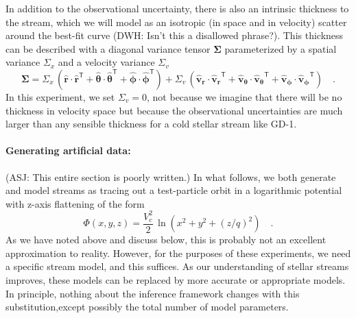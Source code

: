 \documentclass[12pt,preprint]{aastex}
\newcommand{\mtensor}[1]{\boldsymbol{#1}}
\newcommand{\mSigma}{\mtensor{\Sigma}}
\newcommand{\mvector}[1]{\mtensor{#1}}
\renewcommand{\vr}{\mvector{r}}
\newcommand{\vv}{\mvector{v}}
\newcommand{\vtheta}{\mvector{\theta}}
\newcommand{\vphi}{\mvector{\phi}}
\newcommand{\transpose}[1]{{#1}^{\textsf{T}}}
\newcommand{\rhat}{\hat{\vr}}
\newcommand{\thetahat}{\hat{\vtheta}}
\newcommand{\phihat}{\hat{\vphi}}
\newcommand{\vhat}{\hat{\vv}}
\begin{document}
In addition to the observational uncertainty, there is also an
intrinsic thickness to the stream, which we will model as an isotropic
(in space and in velocity) scatter around the best-fit curve (DWH: Isn't this a disallowed phrase?).  This
thickness can be described with a diagonal variance tensor $\mSigma$
parameterized by a spatial variance $\Sigma_x$ and a velocity variance
$\Sigma_v$
\begin{equation}
\mSigma =
  \Sigma_x\,(\rhat\cdot\transpose{\rhat}
            +\thetahat\cdot\transpose{\thetahat}
            +\phihat\cdot\transpose{\phihat})
 +\Sigma_v\,(\vhat_{\vr}\cdot\transpose{\vhat_{\vr}}
            +\vhat_{\vtheta}\cdot\transpose{\vhat_{\vtheta}}
            +\vhat_{\vphi}\cdot\transpose{\vhat_{\vphi}})
\quad .
\end{equation}
In this experiment, we set $\Sigma_v=0$, not because we imagine that
there will be no thickness in velocity space but because the
observational uncertainties are much larger than any sensible
thickness for a cold stellar stream like GD-1.

\paragraph{Generating artificial data:}
(ASJ: This entire section is poorly written.)
In what follows, we both generate and model streams as tracing out a
test-particle orbit in a logarithmic potential with z-axis flattening of the form
\begin{equation}
\Phi(x,y,z) = \frac{V_c^2}{2}\,\ln(x^2+y^2+(z/q)^2)
\quad.
\end{equation}
As we have noted above and discuss below, this is probably not an excellent 
approximation to reality.  However, for the purposes of these experiments, we need a
specific stream model, and this suffices.  As our understanding of
stellar streams improves, these models can be replaced by more accurate or  
appropriate models. In principle, nothing about the inference framework changes 
with this substitution,except possibly the total number of model parameters.
\end{document}
